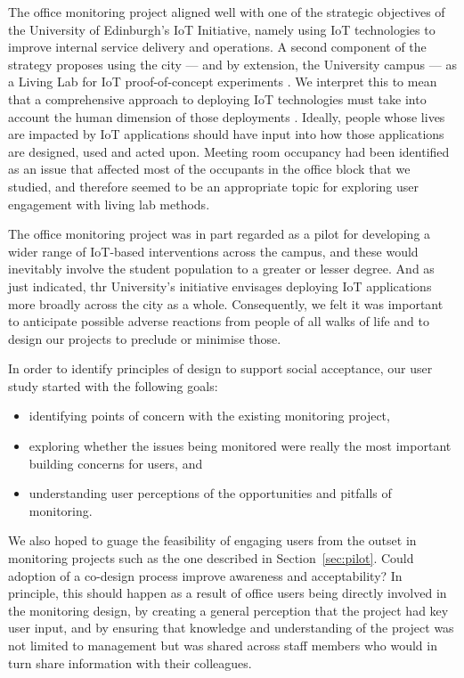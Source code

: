 The office monitoring project aligned well with one of the strategic
objectives of the University of Edinburgh's IoT Initiative, namely
using IoT technologies to improve internal service delivery and
operations. A second component of the strategy proposes using the city
--- and by extension, the University campus --- as a Living Lab for
IoT proof-of-concept experiments \cite{IoT-Strategy}. We interpret
this to mean that a comprehensive approach to deploying IoT
technologies must take into account the human dimension of those
deployments \cite{Shin-2017-UTIO}. Ideally, people whose lives are
impacted by IoT applications should have input into how those
applications are designed, used and acted upon. Meeting room occupancy
had been identified as an issue that affected most of the occupants in
the office block that we studied, and therefore seemed to be an
appropriate topic for exploring user engagement with living lab
methods. 

The office monitoring project was in part regarded as a pilot for
developing a wider range of IoT-based interventions across the campus,
and these would inevitably involve the student population to a greater
or lesser degree. And as just indicated, thr University's initiative
envisages deploying IoT applications more broadly across the city as a
whole. Consequently, we felt it was important to anticipate possible
adverse reactions from people of all walks of life and to design our
projects to preclude or minimise those.  

In order to identify principles of design to support social
acceptance, our user study started with the following goals: 
\begin{itemize}[noitemsep]
\item identifying points of concern with the existing monitoring project,
\item exploring whether the issues being monitored were really the most important building concerns for users, and
\item understanding user perceptions of the opportunities and pitfalls of monitoring.
\end{itemize}

We also hoped to guage the feasibility of engaging users from the
outset in monitoring projects such as the one described in
Section~\ref{sec:pilot}. Could adoption of a co-design process improve
awareness and acceptability? In principle, this should happen as a
result of office users being directly involved in the monitoring
design, by creating a general perception that the project had key user
input, and by ensuring that knowledge and understanding of the project
was not limited to management but was shared across staff members who
would in turn share information with their colleagues. 

